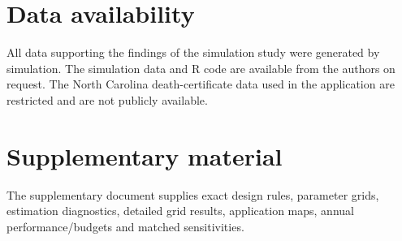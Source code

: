 \documentclass[Afour,sagev,times]{sagej}
\begin{document}
\section*{Data availability}
All data supporting the findings of the simulation study were generated by simulation. The simulation data and R code are available from the authors on request. The North Carolina death-certificate data used in the application are restricted and are not publicly available.
\section*{Supplementary material}
The supplementary document supplies exact design rules, parameter grids, estimation diagnostics, detailed grid results, application maps, annual performance/budgets and matched sensitivities.
\ifctjreading
\balance
\fi



\ifctjreading
\else
\clearpage
\CTJDesignTable
\clearpage
\CTJGridTable
\clearpage
\CTJMapFigure
\clearpage
\CTJGridFigure
\clearpage
\CTJAllocationFigure
\clearpage
\CTJMeanFigure
\clearpage
\fi
\end{document}
